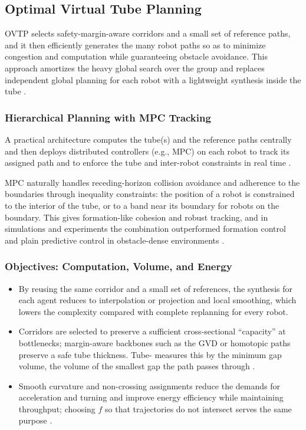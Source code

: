 \subsection{Optimal Virtual Tube Planning}

OVTP selects safety-margin-aware corridors and a small set of reference paths,
and it then efficiently generates the many robot paths so as to minimize
congestion and computation while guaranteeing obstacle avoidance. This approach
amortizes the heavy global search over the group and replaces independent global
planning for each robot with a lightweight synthesis inside the tube \cite{mao2023optimal}.

\subsubsection{Hierarchical Planning with MPC Tracking}

A practical architecture computes the tube(s) and the reference paths centrally
and then deploys distributed controllers (e.g., MPC) on each robot to track its
assigned path and to enforce the tube and inter-robot constraints in real time
\cite{mao2023optimal}.

MPC naturally handles receding-horizon collision avoidance and adherence to the
boundaries through inequality constraints: the position of a robot is
constrained to the interior of the tube, or to a band near its boundary for
robots on the boundary. This gives formation-like cohesion and robust tracking,
and in simulations and experiments the combination outperformed formation
control and plain predictive control in obstacle-dense environments
\cite{mao2023optimal}.

\subsubsection{Objectives: Computation, Volume, and Energy}

\begin{itemize}
  \item {} By reusing the same corridor and a small set of
        references, the synthesis for each agent reduces to interpolation or
        projection and local smoothing, which lowers the complexity compared with
        complete replanning for every robot.
  \item {} Corridors are selected to preserve a
        sufficient cross-sectional ``capacity'' at bottlenecks; margin-aware
        backbones such as the GVD or homotopic paths preserve a safe tube
        thickness. Tube-\RRTstar{} measures this by the minimum gap volume, the
        volume of the smallest gap the path passes through \cite{mao2024tube}.
  \item {} Smooth curvature and non-crossing assignments reduce the
        demands for acceleration and turning and improve energy efficiency while
        maintaining throughput; choosing $f$ so that trajectories do not
        intersect serves the same purpose \cite{mao2023optimal}.
\end{itemize}

